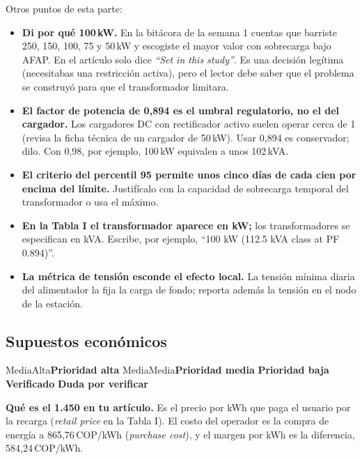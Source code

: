 \documentclass[11pt]{article}
\newcommand{\prioridad}[1]{%
  \def\tmpA{Alta}\def\tmpM{Media}\def\tmp{#1}%
  \ifx\tmp\tmpA\colorbox{rojoerror}{\color{white}\small\bfseries Prioridad alta}%
  \else\ifx\tmp\tmpM\colorbox{naranjatarea}{\color{white}\small\bfseries Prioridad media}%
  \else\colorbox{azulidea}{\color{white}\small\bfseries Prioridad baja}\fi\fi}
\newcommand{\pordudar}{\colorbox{black!10}{\small\bfseries\color{black!75} Duda por verificar}}
\newcommand{\verificado}{\colorbox{verdeej!15}{\small\bfseries\color{verdeej} Verificado}}
\begin{document}
Otros puntos de esta parte:
\begin{itemize}[leftmargin=1.2em]
\item \textbf{Di por qué 100\,kW.} En la bitácora de la semana 1 cuentas que barriste 250, 150, 100, 75 y 50\,kW y escogiste el mayor valor con sobrecarga bajo AFAP. En el artículo solo dice \foreignlanguage{english}{\emph{``Set in this study''}}. Es una decisión legítima (necesitabas una restricción activa), pero el lector debe saber que el problema se construyó para que el transformador limitara.
\item \textbf{El factor de potencia de 0,894 es el umbral regulatorio, no el del cargador.} Los cargadores DC con rectificador activo suelen operar cerca de 1 (revisa la ficha técnica de un cargador de 50\,kW). Usar 0,894 es conservador; dilo. Con 0,98, por ejemplo, 100\,kW equivalen a unos 102\,kVA.
\item \textbf{El criterio del percentil 95 permite unos cinco días de cada cien por encima del límite.} Justifícalo con la capacidad de sobrecarga temporal del transformador o usa el máximo.
\item \textbf{En la Tabla I el transformador aparece en kW;} los transformadores se especifican en kVA. Escribe, por ejemplo, ``100 kW (112.5 kVA class at PF 0.894)''.
\item \textbf{La métrica de tensión esconde el efecto local.} La tensión mínima diaria del alimentador la fija la carga de fondo; reporta además la tensión en el nodo de la estación.
\end{itemize}

\subsection{Supuestos económicos}
\prioridad{Media} \verificado{} \pordudar

\textbf{Qué es el 1.450 en tu artículo.} Es el precio por kWh que paga el usuario por la recarga (\foreignlanguage{english}{\emph{retail price}} en la Tabla I). El costo del operador es la compra de energía a 865,76\,COP/kWh (\foreignlanguage{english}{\emph{purchase cost}}), y el margen por kWh es la diferencia, 584,24\,COP/kWh.
\end{document}
